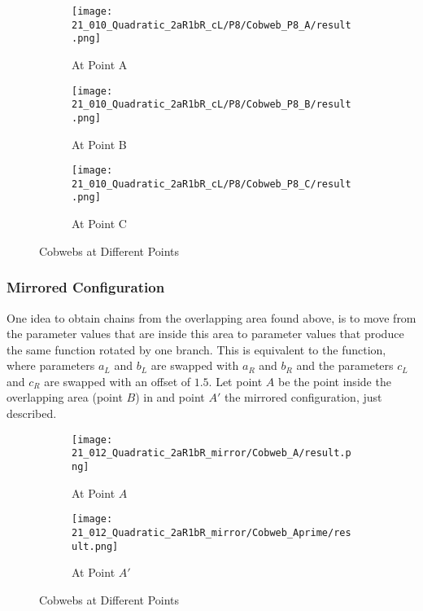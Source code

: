 \begin{figure}
	\centering
	\begin{subfigure}{0.3\textwidth}
		\centering
		\texttt{[image: 21\_010\_Quadratic\_2aR1bR\_cL/P8/Cobweb\_P8\_A/result.png]}
		\caption{At Point A}
		\label{fig:quad.full.2aR1bR_cL.2.CobwebA}
	\end{subfigure}
	\begin{subfigure}{0.3\textwidth}
		\centering
		\texttt{[image: 21\_010\_Quadratic\_2aR1bR\_cL/P8/Cobweb\_P8\_B/result.png]}
		\caption{At Point B}
		\label{fig:quad.full.2aR1bR_cL.2.CobwebB}
	\end{subfigure}
	\begin{subfigure}{0.3\textwidth}
		\centering
		\texttt{[image: 21\_010\_Quadratic\_2aR1bR\_cL/P8/Cobweb\_P8\_C/result.png]}
		\caption{At Point C}
		\label{fig:quad.full.2aR1bR_cL.2.CobwebC}
	\end{subfigure}
	\caption{Cobwebs at Different Points}
	\label{fig:quad.full.2aR1bR_cL.2.Cobwebs}
\end{figure}

\subsubsection{Mirrored Configuration}

One idea to obtain chains from the overlapping area found above, is to move from the parameter values that are inside this area to parameter values that produce the same function rotated by one branch.
This is equivalent to the function, where parameters $a_L$ and $b_L$ are swapped with $a_R$ and $b_R$ and the parameters $c_L$ and $c_R$ are swapped with an offset of $1.5$.
Let point $A$ be the point inside the overlapping area (point $B$) in  and point $A'$ the mirrored configuration, just described.

\begin{figure}
	\centering
	\begin{subfigure}{0.4\textwidth}
		\centering
		\texttt{[image: 21\_012\_Quadratic\_2aR1bR\_mirror/Cobweb\_A/result.png]}
		\caption{At Point $A$}
		\label{fig:quad.full.2aR1bR_cL_mirr.1.CobwebA}
	\end{subfigure}
	\begin{subfigure}{0.4\textwidth}
		\centering
		\texttt{[image: 21\_012\_Quadratic\_2aR1bR\_mirror/Cobweb\_Aprime/result.png]}
		\caption{At Point $A'$}
		\label{fig:quad.full.2aR1bR_cL_mirr.1.CobwebAprime}
	\end{subfigure}
	\caption{Cobwebs at Different Points}
	\label{fig:quad.full.2aR1bR_cL_mirr.1.Cobwebsprime}
\end{figure}

